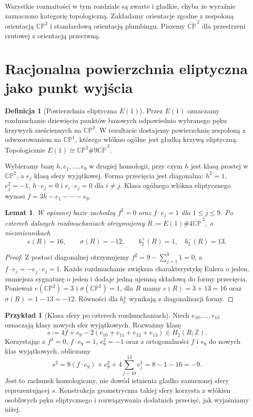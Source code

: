 \documentclass[11pt,a4paper]{report}
\numberwithin{equation}{section}
\theoremstyle{plain}
\newtheorem{lemat}[twierdzenie]{Lemat}
\theoremstyle{definition}
\newtheorem{definicja}[twierdzenie]{Definicja}
\newtheorem{przyklad}[twierdzenie]{Przykład}
\theoremstyle{remark}
\begin{document}
Wszystkie rozmaitości w tym rozdziale są zwarte i gładkie,
chyba że wyraźnie zaznaczono kategorię topologiczną.
Zakładamy orientacje zgodne z zespoloną orientacją
$\mathbb{CP}^{2}$ i standardową orientacją plumbingu.
Piszemy $\overline{\mathbb{CP}}^{\,2}$ dla przestrzeni
rzutowej z orientacją przeciwną.

\section{Racjonalna powierzchnia eliptyczna jako punkt wyjścia}
\label{sec:tg-park-e1}

\begin{definicja}[Powierzchnia eliptyczna $E(1)$]
Przez $E(1)$ oznaczamy rozdmuchanie dziewięciu punktów
bazowych odpowiednio wybranego pęku krzywych sześciennych
na $\mathbb{CP}^{2}$. W rezultacie dostajemy powierzchnię
zespoloną z odwzorowaniem na $\mathbb{CP}^{1}$, którego
włókno ogólne jest gładką krzywą eliptyczną. Topologicznie
$E(1)\cong\mathbb{CP}^{2}\#9\overline{\mathbb{CP}}^{\,2}$.
\end{definicja}

Wybieramy bazę $h,e_1,\ldots,e_9$ w drugiej homologii,
przy czym $h$ jest klasą prostej w $\mathbb{CP}^{2}$,
a $e_j$ klasą sfery wyjątkowej. Forma przecięcia jest
diagonalna: $h^2=1$, $e_j^2=-1$, $h\cdot e_j=0$
i $e_i\cdot e_j=0$ dla $i\ne j$.
Klasa ogólnego włókna eliptycznego wynosi
$f=3h-e_1-\cdots-e_9$.

\begin{lemat}
\label{lem:tg-park-fiber}
W opisanej bazie zachodzą $f^2=0$ oraz $f\cdot e_j=1$
dla $1\le j\le9$. Po czterech dalszych rozdmuchaniach
otrzymujemy $R:=E(1)\#4\overline{\mathbb{CP}}^{\,2}$,
o niezmiennikach
\[
e(R)=16,\qquad \sigma(R)=-12,\qquad
b_2^+(R)=1,\quad b_2^-(R)=13.
\]
\end{lemat}

\begin{proof}
Z postaci diagonalnej otrzymujemy
$f^2=9-\sum_{j=1}^{9}1=0$,
a $f\cdot e_j=-e_j\cdot e_j=1$.
Każde rozdmuchanie zwiększa charakterystykę Eulera
o jeden, zmniejsza sygnaturę o jeden i dodaje jedną
ujemną składową do formy przecięcia. Ponieważ
$e(\mathbb{CP}^{2})=3$ i
$\sigma(\mathbb{CP}^{2})=1$, dla $R$ mamy
$e(R)=3+13=16$ oraz $\sigma(R)=1-13=-12$.
Równości dla $b_2^\pm$ wynikają z diagonalizacji formy.
\end{proof}

\begin{przyklad}[Klasa sfery po czterech rozdmuchaniach]
\label{ex:tg-park-S}
Niech $e_{10},\ldots,e_{13}$ oznaczają klasy nowych
sfer wyjątkowych. Rozważmy klasę
\[
s:=4f+e_9-2(e_{10}+e_{11}+e_{12}+e_{13})\in H_2(R;\mathbb Z).
\]
Korzystając z $f^2=0$, $f\cdot e_9=1$,
$e_9^2=-1$ oraz z ortogonalności $f$ i $e_9$ do nowych klas
wyjątkowych, obliczamy
\[
s^2=8(f\cdot e_9)+e_9^2
   +4\sum_{j=10}^{13}e_j^2=8-1-16=-9.
\]
Jest to rachunek homologiczny, nie dowód istnienia
gładko zanurzonej sfery reprezentującej $s$.
Konstrukcja geometryczna takiej sfery korzysta z włókien
osobliwych pęku eliptycznego i rozwiązywania dodatnich
przecięć, jak wyjaśniamy niżej.
\end{przyklad}
\end{document}
